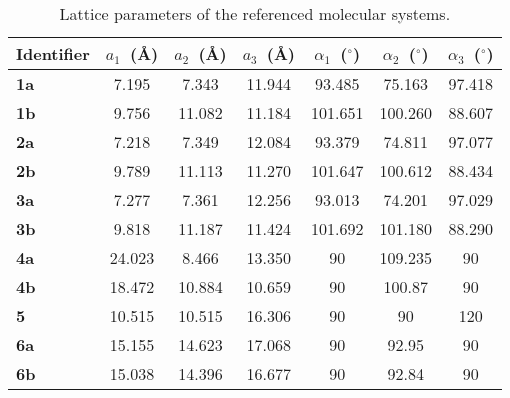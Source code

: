 \begin{table}[htp!]
  \centering
  \renewcommand*{\arraystretch}{1.5}{
    \begin{tabular}{ C{1.8cm} cccccc}
      \toprule
      Identifier & $a_1$~(\AA) & $a_2$~(\AA) & $a_3$~(\AA) &
        $\alpha_1$~($^\circ$) & $\alpha_2$~($^\circ$) & $\alpha_3$~($^\circ$) \\
      \midrule
      \textbf{1a} & 7.195  & 7.343  & 11.944 & 93.485  & 75.163  & 97.418 \\
      \textbf{1b} & 9.756  & 11.082 & 11.184 & 101.651 & 100.260 & 88.607 \\
      \textbf{2a} & 7.218  & 7.349  & 12.084 & 93.379  & 74.811  & 97.077 \\
      \textbf{2b} & 9.789  & 11.113 & 11.270 & 101.647 & 100.612 & 88.434 \\
      \textbf{3a} & 7.277  & 7.361  & 12.256 & 93.013  & 74.201  & 97.029 \\
      \textbf{3b} & 9.818  & 11.187 & 11.424 & 101.692 & 101.180 & 88.290 \\
      \textbf{4a} & 24.023 & 8.466  & 13.350 & 90 & 109.235 & 90 \\
      \textbf{4b} & 18.472 & 10.884 & 10.659 & 90 & 100.87 & 90 \\
      \textbf{5}  & 10.515 & 10.515 & 16.306 & 90 & 90 & 120 \\
      \textbf{6a} & 15.155 & 14.623 & 17.068 & 90 & 92.95 & 90 \\
      \textbf{6b} & 15.038 & 14.396 & 16.677 & 90 & 92.84 & 90 \\
      \bottomrule
    \end{tabular}
  }
  \caption{Lattice parameters of the referenced molecular systems.}
  \label{tab: cif2}
\end{table}
